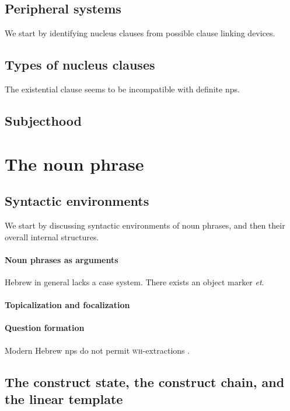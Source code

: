 \documentclass[a4paper, oneside, 12pt]{report}
\newcommand{\form}[1]{\emph{#1}}
\newcommand{\category}[1]{\textsc{#1}}
\begin{document}
\subsection{Peripheral systems}

We start by identifying nucleus clauses from possible clause linking devices.


\subsection{Types of nucleus clauses}

The existential clause seems to be incompatible with definite \acp{np}.

\subsection{Subjecthood}


\section{The noun phrase}

\subsection{Syntactic environments}

We start by discussing syntactic environments of noun phrases,
and then their overall internal structures.

\paragraph*{Noun phrases as arguments}
Hebrew in general lacks a case system.
There exists an object marker \form{et}.

\paragraph*{Topicalization and focalization}

\paragraph*{Question formation}
Modern Hebrew \acp{np} do not permit \category{wh}-extractions
\citep{shlonsky2012some}.

\subsection{The construct state, the construct chain, and the linear template}
\end{document}
